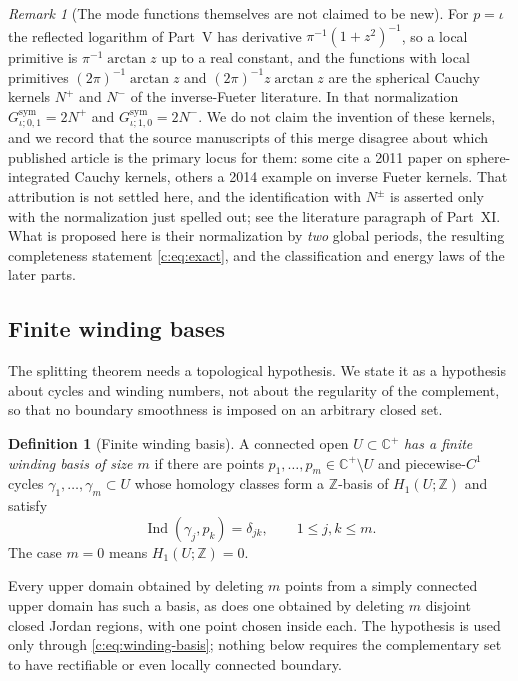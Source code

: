 \documentclass[11pt,a4paper]{article}
\numberwithin{equation}{section}
\theoremstyle{definition}
\newtheorem{definition}[theorem]{Definition}
\theoremstyle{remark}
\newtheorem{remark}[theorem]{Remark}
\theoremstyle{plain}
\newcommand{\CC}{\mathbb C}
\newcommand{\ZZ}{\mathbb Z}
\newcommand{\Cplus}{\CC^{+}}
\DeclareMathOperator{\Ind}{Ind}
\begin{document}
\begin{remark}[The mode functions themselves are not claimed to be new]
\label{c:rem:known-modes}
For $p=\iota$ the reflected logarithm of Part~V has derivative
$\pi^{-1}(1+z^2)^{-1}$, so a local primitive is
$\pi^{-1}\arctan z$ up to a real constant, and the functions with local
primitives $(2\pi)^{-1}\arctan z$ and $(2\pi)^{-1}z\arctan z$ are the
spherical Cauchy kernels $N^{+}$ and $N^{-}$ of the inverse-Fueter
literature.  In that normalization
$G^{\mathrm{sym}}_{\iota;0,1}=2N^{+}$ and
$G^{\mathrm{sym}}_{\iota;1,0}=2N^{-}$.  We do not claim the invention of
these kernels, and we record that the source manuscripts of this merge
disagree about which published article is the primary locus for them:
some cite a 2011 paper on sphere-integrated Cauchy kernels, others a
2014 example on inverse Fueter kernels.  That attribution is not settled
here, and the identification with $N^{\pm}$ is asserted only with the
normalization just spelled out; see the literature paragraph of
Part~XI.  What is proposed here is their normalization by \emph{two}
global periods, the resulting completeness statement
\eqref{c:eq:exact}, and the classification and energy laws of the later
parts.
\end{remark}

\subsection{Finite winding bases}

The splitting theorem needs a topological hypothesis.  We state it as a
hypothesis about cycles and winding numbers, not about the regularity of
the complement, so that no boundary smoothness is imposed on an arbitrary
closed set.

\begin{definition}[Finite winding basis]
\label{c:def:winding}
A connected open $U\subset\Cplus$ \emph{has a finite winding basis of
size $m$} if there are points $p_1,\dots,p_m\in\Cplus\setminus U$ and
piecewise-$C^1$ cycles $\gamma_1,\dots,\gamma_m\subset U$ whose homology
classes form a $\ZZ$-basis of $H_1(U;\ZZ)$ and satisfy
\begin{equation}
  \Ind(\gamma_j,p_k)=\delta_{jk},\qquad 1\le j,k\le m .
  \label{c:eq:winding-basis}
\end{equation}
The case $m=0$ means $H_1(U;\ZZ)=0$.
\end{definition}

Every upper domain obtained by deleting $m$ points from a simply
connected upper domain has such a basis, as does one obtained by deleting
$m$ disjoint closed Jordan regions, with one point chosen inside each.
The hypothesis is used only through \eqref{c:eq:winding-basis}; nothing
below requires the complementary set to have rectifiable or even
locally connected boundary.
\end{document}
